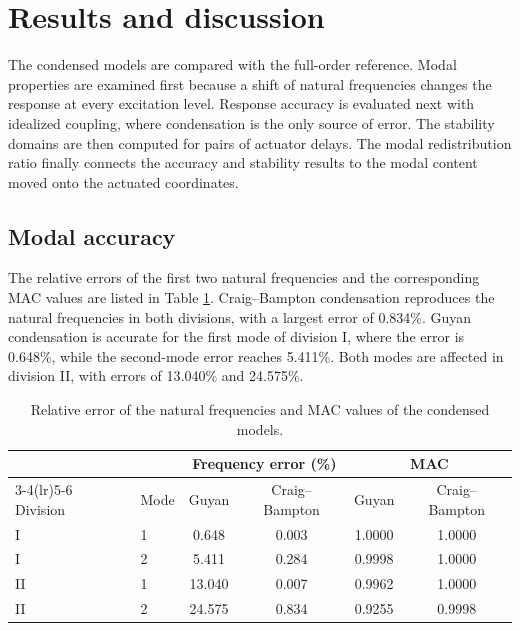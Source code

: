 \documentclass[a4paper,fleqn,review,12pt]{cas-sc}
\numberwithin{equation}{section}
\begin{document}
\section{Results and discussion} \label{sec5}

The condensed models are compared with the full-order reference. Modal properties are examined first because a shift of natural frequencies changes the response at every excitation level. Response accuracy is evaluated next with idealized coupling, where condensation is the only source of error. The stability domains are then computed for pairs of actuator delays. The modal redistribution ratio finally connects the accuracy and stability results to the modal content moved onto the actuated coordinates.

\subsection{Modal accuracy}
\label{sec:modal-accuracy}

The relative errors of the first two natural frequencies and the corresponding MAC values are listed in Table \ref{tab:modal}. Craig--Bampton condensation reproduces the natural frequencies in both divisions, with a largest error of 0.834\%. Guyan condensation is accurate for the first mode of division I, where the error is 0.648\%, while the second-mode error reaches 5.411\%. Both modes are affected in division II, with errors of 13.040\% and 24.575\%.

\begin{table}[htbp]
  \centering
  \caption{Relative error of the natural frequencies and MAC values of the condensed models.}
  \label{tab:modal}
  \begin{tabular}{llcccc}
    \toprule
    & & \multicolumn{2}{c}{Frequency error (\%)} & \multicolumn{2}{c}{MAC}\\
    \cmidrule(lr){3-4}\cmidrule(lr){5-6}
    Division & Mode & Guyan & Craig--Bampton & Guyan & Craig--Bampton\\
    \midrule
    I & 1 & 0.648 & 0.003 & 1.0000 & 1.0000\\
    I & 2 & 5.411 & 0.284 & 0.9998 & 1.0000\\
    \midrule
    II & 1 & 13.040 & 0.007 & 0.9962 & 1.0000\\
    II & 2 & 24.575 & 0.834 & 0.9255 & 0.9998\\
    \bottomrule
  \end{tabular}
\end{table}
\end{document}
